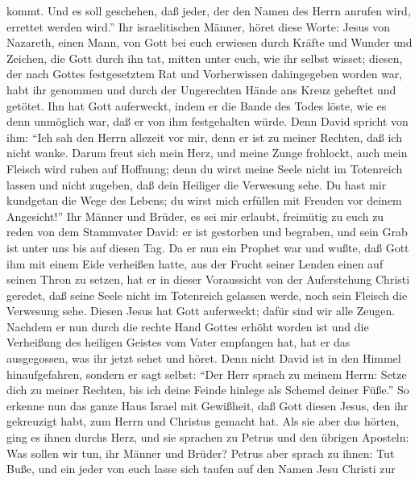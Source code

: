 kommt.  Und es soll geschehen, daß jeder, der den Namen
des Herrn anrufen wird, errettet werden wird.''  Ihr
israelitischen Männer, höret diese Worte: Jesus von Nazareth, einen
Mann, von Gott bei euch erwiesen durch Kräfte und Wunder und Zeichen,
die Gott durch ihn tat, mitten unter euch, wie ihr selbst wisset;
 diesen, der nach Gottes festgesetztem Rat und
Vorherwissen dahingegeben worden war, habt ihr genommen und durch der
Ungerechten Hände ans Kreuz geheftet und getötet.  Ihn
hat Gott auferweckt, indem er die Bande des Todes löste, wie es denn
unmöglich war, daß er von ihm festgehalten würde.  Denn
David spricht von ihm: ``Ich sah den Herrn allezeit vor mir, denn er ist
zu meiner Rechten, daß ich nicht wanke.  Darum freut sich
mein Herz, und meine Zunge frohlockt, auch mein Fleisch wird ruhen auf
Hoffnung;  denn du wirst meine Seele nicht im Totenreich
lassen und nicht zugeben, daß dein Heiliger die Verwesung sehe.
 Du hast mir kundgetan die Wege des Lebens; du wirst mich
erfüllen mit Freuden vor deinem Angesicht!''  Ihr Männer
und Brüder, es sei mir erlaubt, freimütig zu euch zu reden von dem
Stammvater David: er ist gestorben und begraben, und sein Grab ist unter
uns bis auf diesen Tag.  Da er nun ein Prophet war und
wußte, daß Gott ihm mit einem Eide verheißen hatte, aus der Frucht
seiner Lenden einen auf seinen Thron zu setzen,  hat er
in dieser Voraussicht von der Auferstehung Christi geredet, daß seine
Seele nicht im Totenreich gelassen werde, noch sein Fleisch die
Verwesung sehe.  Diesen Jesus hat Gott auferweckt; dafür
sind wir alle Zeugen.  Nachdem er nun durch die rechte
Hand Gottes erhöht worden ist und die Verheißung des heiligen Geistes
vom Vater empfangen hat, hat er das ausgegossen, was ihr jetzt sehet und
höret.  Denn nicht David ist in den Himmel
hinaufgefahren, sondern er sagt selbst: ``Der Herr sprach zu meinem
Herrn: Setze dich zu meiner Rechten,  bis ich deine
Feinde hinlege als Schemel deiner Füße.''  So erkenne nun
das ganze Haus Israel mit Gewißheit, daß Gott diesen Jesus, den ihr
gekreuzigt habt, zum Herrn und Christus gemacht hat.  Als
sie aber das hörten, ging es ihnen durchs Herz, und sie sprachen zu
Petrus und den übrigen Aposteln: Was sollen wir tun, ihr Männer und
Brüder?  Petrus aber sprach zu ihnen: Tut Buße, und ein
jeder von euch lasse sich taufen auf den Namen Jesu Christi zur
